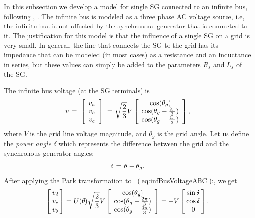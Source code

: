 \documentclass[conference]{IEEEtran}
\newcommand{\BE}{\begin{equation}}
\newcommand{\BEQ}[1]{\BE\label{#1}} %
\newcommand{\rfb}[1]{\mbox{\rm
   (\ref{#1})}\ifx\undefined\stillediting\else:\fbox{$#1$}\fi}
\newcommand{\m}      {{\hbox{\hskip 1pt}}}
\newcommand{\nm}     {{\hbox{\hskip -3pt}}}
\begin{document}
In this subsection we develop a model for single SG connected to an
infinite bus, following \cite{NaWe:14}, \cite{NaWe:15}. The infinite
bus is modeled as a three phase AC voltage source, i.e, the infinite
bus is not affected by the synchronous generator that is connected to
it. The justification for this model is that the influence of a single
SG on a grid is very small. In general, the line that connects the SG
to the grid has its impedance that can be modeled (in most cases) as a
resistance and an inductance in series, but these values can simply be
added to the parameters $R_s$ and $L_s$ of the SG.

The infinite bus voltage (at the SG terminals) is
\BEQ{eq:infBusVoltageABC}
   v \m=\m \left[\begin{array}{c} v_a\\ v_b\\ v_c \end{array}\right]
   \m=\m \sqrt{\frac{2}{3}} V\left[ \begin{array}{c} \cos(\theta_{g})
   \\ \cos(\theta_{g}-\frac{2\pi}{3})\\ \cos(\theta_{g}-\frac{4\pi}
   {3}) \end{array}\right] ,
\end{equation}
where $V$ is the grid line voltage magnitude, and $\theta_g$ is the
grid angle. Let us define the {\em power angle} $\delta$ which
represents the difference between the grid and the synchronous
generator angles: \vspace{-2mm}
$$ \delta \m=\m \theta-\theta_g \m.$$
After applying the Park transformation to \rfb{eq:infBusVoltageABC},
we get 
\BEQ{BusVoltage}
   \left[\nm\begin{array}{c} v_d\\ v_q\\ v_0 \end{array} \nm\right]
   = U(\theta)\sqrt{\frac{2}{3}}V\left[\begin{array}{c} \cos
   (\theta_g)\\ \cos(\theta_g-\frac{2\pi}{3})\\ \cos(\theta_g
   -\frac{4\pi}{3}) \end{array}\right] = -V\left[\nm \begin
   {array}{c} \sin\delta\\ \cos\delta\\ 0 \end{array}\nm\right].
\end{equation}
\end{document}
